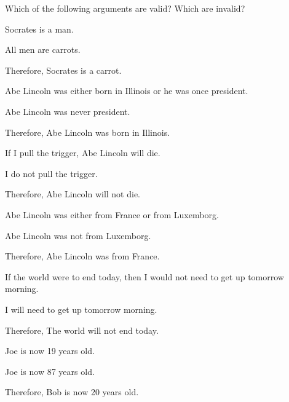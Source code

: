 
\practiceproblems
\problempart
Which of the following arguments are valid? Which are invalid?

\begin{earg}
\item Socrates is a man.
\item All men are carrots.
\item Therefore, Socrates is a carrot.
\end{earg}

\begin{earg}
\item Abe Lincoln was either born in Illinois or he was once president.
\item Abe Lincoln was never president.
\item Therefore, Abe Lincoln was born in Illinois.
\end{earg}

\begin{earg}
\item If I pull the trigger, Abe Lincoln will die.
\item I do not pull the trigger.
\item Therefore, Abe Lincoln will not die.
\end{earg}

\begin{earg}
\item Abe Lincoln was either from France or from Luxemborg.
\item Abe Lincoln was not from Luxemborg.
\item Therefore, Abe Lincoln was from France.
\end{earg}

\begin{earg}
\item If the world were to end today, then I would not need to get up tomorrow morning.
\item I will need to get up tomorrow morning.
\item Therefore, The world will not end today.
\end{earg}

\begin{earg}
\item Joe is now 19 years old.
\item Joe is now 87 years old.
\item Therefore, Bob is now 20 years old.
\end{earg}

